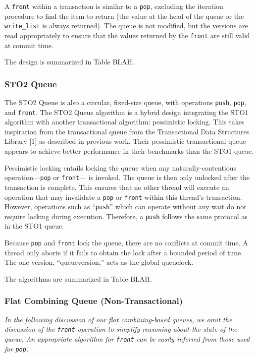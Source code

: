 A \texttt{front} within a transaction is similar to a \texttt{pop}, excluding the iteration procedure to find the item to return (the value at the head of the queue or the \texttt{write\_list} is always returned). The queue is not modified, but the versions are read appropriately to ensure that the values returned by the \texttt{front} are still valid at commit time.

The design is summarized in Table BLAH.

\subsubsection{STO2 Queue}
The STO2 Queue is also a circular, fixed-size queue, with operations \texttt{push}, \texttt{pop}, and \texttt{front}. The STO2 Queue algorithm is a hybrid design integrating the STO1 algorithm with another transactional algorithm: pessimistic locking. This takes inspiration from the transactional queue from the Transactional Data Structures Library [1] as described in previous work. Their pessimistic transactional queue appears to achieve better performance in their benchmarks than the STO1 queue. 

Pessimistic locking entails locking the queue when any naturally-contentious operation---\texttt{pop} or \texttt{front}--- is invoked. The queue is then only unlocked after the transaction is complete. This ensures that no other thread will execute an operation that may invalidate a \texttt{pop} or \texttt{front} within this thread’s transaction. However, operations such as “\texttt{push}” which can operate without any wait do not require locking during execution. Therefore, a \texttt{push} follows the same protocol as in the STO1 queue.

Because \texttt{pop} and \texttt{front} lock the queue, there are no conflicts at commit time. A thread only aborts if it fails to obtain the lock after a bounded period of time. The one version, “queueversion,” acts as the global queuelock. 

The algorithms are summarized in Table BLAH.

\subsubsection{Flat Combining Queue (Non-Transactional)}

\emph{In the following discussion of our flat combining-based queues, we omit the discussion of the \texttt{front} operation to simplify reasoning about the state of the queue. An appropriate algorithm for \texttt{front} can be easily inferred from those used for \texttt{pop}.}

